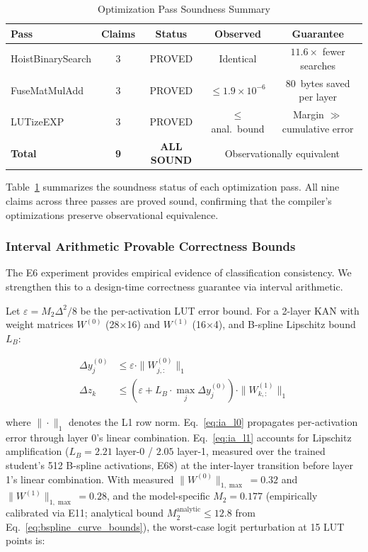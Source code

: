 \documentclass[journal,onecolumn]{IEEEtran}
\begin{document}
\begin{table}[t]
\centering
\caption{Optimization Pass Soundness Summary}
\label{tab:opt_soundness}
\footnotesize
\begin{tabular}{@{}lcccc@{}}
\toprule
\textbf{Pass} & \textbf{Claims} & \textbf{Status} & \textbf{Observed} & \textbf{Guarantee} \\
\midrule
HoistBinarySearch & 3 & PROVED & Identical & $11.6\times$ fewer searches \\
FuseMatMulAdd    & 3 & PROVED & $\leq 1.9{\times}10^{-6}$ & 80~bytes saved per layer \\
LUTizeEXP       & 3 & PROVED & $\leq$ anal.\ bound & Margin $\gg$ cumulative error \\
\midrule
\textbf{Total}  & \textbf{9} & \textbf{ALL SOUND} & \multicolumn{2}{c}{Observationally equivalent} \\
\bottomrule
\end{tabular}
\end{table}

Table~\ref{tab:opt_soundness} summarizes the soundness status of each optimization pass. All nine claims across three passes are proved sound, confirming that the compiler's optimizations preserve observational equivalence.

\subsubsection{Interval Arithmetic Provable Correctness Bounds}

The E6 experiment provides empirical evidence of classification
consistency. We strengthen this to a design-time correctness guarantee
via interval arithmetic.

Let $\varepsilon = M_2\Delta^2/8$ be the per-activation LUT error bound.
For a 2-layer KAN with weight matrices $W^{(0)}$ (28$\times$16) and
$W^{(1)}$ (16$\times$4), and B-spline Lipschitz bound $L_B$:

\begin{align}
\Delta y^{(0)}_j &\leq \varepsilon \cdot \|W^{(0)}_{j,:}\|_1 \label{eq:ia_l0}\\
\Delta z_k &\leq (\varepsilon + L_B \cdot \max_j \Delta y^{(0)}_j)
               \cdot \|W^{(1)}_{k,:}\|_1 \label{eq:ia_l1}
\end{align}

where $\|\cdot\|_1$ denotes the L1 row norm. Eq.~\eqref{eq:ia_l0}
propagates per-activation error through layer 0's linear combination.
Eq.~\eqref{eq:ia_l1} accounts for Lipschitz amplification ($L_B = 2.21$
layer-0 / $2.05$ layer-1, measured over the trained student's 512
B-spline activations, E68) at the inter-layer transition before layer 1's
linear combination.
With measured $\|W^{(0)}\|_{1,\max} = 0.32$ and
$\|W^{(1)}\|_{1,\max} = 0.28$, and the model-specific $M_2 = 0.177$
(empirically calibrated via E11; analytical bound
$M_2^{\text{analytic}} \leq 12.8$ from Eq.~\ref{eq:bspline_curve_bounds}),
the worst-case logit perturbation at 15 LUT points is:
\end{document}
